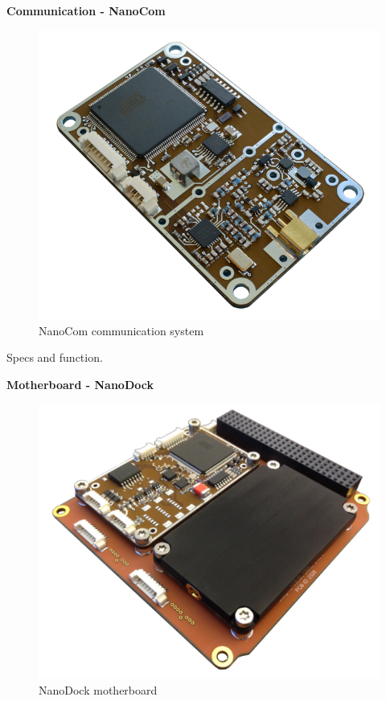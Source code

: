 \documentclass[english,12pt,a4paper,pdftex,elec,utf8]{aaltothesis}
\begin{document}
\textbf{Communication - NanoCom}\par 
\begin{figure}[h!]
\caption{NanoCom communication system}
\includegraphics[scale=0.2]{nanocomm_pcb}
\end{figure} 
Specs and function.\par
\textbf{Motherboard - NanoDock}\par
\begin{figure}[h!]
\caption{NanoDock motherboard}
\includegraphics[scale=0.2]{nanodock_mind_comm}
\end{figure}  
\end{document}
